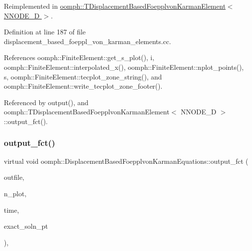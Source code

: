 Reimplemented in \hyperlink{classoomph_1_1TDisplacementBasedFoepplvonKarmanElement_a93812c3e443269fa8b272249bdce6b5e}{oomph\+::\+T\+Displacement\+Based\+Foepplvon\+Karman\+Element$<$ N\+N\+O\+D\+E\+\_\+D $>$}.



Definition at line 187 of file displacement\+\_\+based\+\_\+foeppl\+\_\+von\+\_\+karman\+\_\+elements.\+cc.



References oomph\+::\+Finite\+Element\+::get\+\_\+s\+\_\+plot(), i, oomph\+::\+Finite\+Element\+::interpolated\+\_\+x(), oomph\+::\+Finite\+Element\+::nplot\+\_\+points(), s, oomph\+::\+Finite\+Element\+::tecplot\+\_\+zone\+\_\+string(), and oomph\+::\+Finite\+Element\+::write\+\_\+tecplot\+\_\+zone\+\_\+footer().



Referenced by output(), and oomph\+::\+T\+Displacement\+Based\+Foepplvon\+Karman\+Element$<$ N\+N\+O\+D\+E\+\_\+D $>$\+::output\+\_\+fct().

\mbox{\label{classoomph_1_1DisplacementBasedFoepplvonKarmanEquations_a55cc825e8aedbc958617b03dea2afe29}} 
\subsubsection{\texorpdfstring{output\+\_\+fct()}{output\_fct()}\hspace{0.1cm}{\footnotesize\ttfamily [2/2]}}
{\footnotesize\ttfamily virtual void oomph\+::\+Displacement\+Based\+Foepplvon\+Karman\+Equations\+::output\+\_\+fct (\begin{DoxyParamCaption}\item[{std\+::ostream \&}]{outfile,  }\item[{const unsigned \&}]{n\+\_\+plot,  }\item[{const double \&}]{time,  }\item[{\hyperlink{classoomph_1_1FiniteElement_ad4ecf2b61b158a4b4d351a60d23c633e}{Finite\+Element\+::\+Unsteady\+Exact\+Solution\+Fct\+Pt}}]{exact\+\_\+soln\+\_\+pt }\end{DoxyParamCaption})\hspace{0.3cm}{\ttfamily [inline]}, {\ttfamily [virtual]}}




